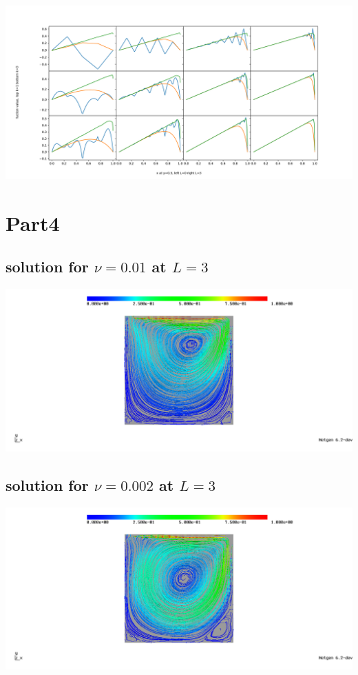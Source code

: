 \documentclass[11pt]{article}
\begin{document}
\includegraphics[width=\columnwidth]{cut_ex3_123.pdf}

\section{Part4}

\subsection{solution for $\nu=0.01$ at $L=3$}

\includegraphics[width=\columnwidth]{ex34_001_stream}


\subsection{solution for $\nu=0.002$ at $L=3$}
\includegraphics[width=\columnwidth]{ex34_0002_stream}
\end{document}
